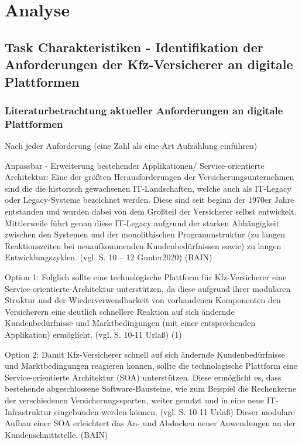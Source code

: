 \chapter{Analyse}
\section{Task Charakteristiken - Identifikation der Anforderungen der Kfz-Versicherer an digitale Plattformen}

\subsection{Literaturbetrachtung aktueller Anforderungen an digitale Plattformen}

Nach jeder Anforderung (eine Zahl als eine Art Aufzählung einführen)

Anpassbar - Erweiterung bestehender Applikationen/ Service-orientierte Architektur: Eine der größten Herausforderungen der Versicherungsunternehmen sind die die historisch gewachsenen IT-Landschaften, welche auch als IT-Legacy oder Legacy-Systeme bezeichnet werden. Diese sind seit beginn der 1970er Jahre entstanden und wurden dabei von dem Großteil der Versicherer selbst entwickelt. Mittlerweile führt genau diese IT-Legacy aufgrund der starken Abhängigkeit zwischen den Systemen und der monolithischen Programmstruktur (zu langen Reaktionszeiten bei neuaufkommenden Kundenbedürfnissen sowie) zu langen Entwicklungszyklen. (vgl. S. 10 – 12 Gunter2020) (BAIN)

Option 1:
Folglich sollte eine technologische Plattform für Kfz-Versicherer eine Service-orientierte-Architektur unterstützen, da diese aufgrund ihrer modularen Struktur und der Wiederverwendbarkeit von vorhandenen Komponenten den Versicherern eine deutlich schnellere Reaktion auf sich ändernde Kundenbedürfnisse und Marktbedingungen (mit einer entsprechenden Applikation) ermöglicht. (vgl. S. 10-11 Urlaß) (1) 

Option 2:
Damit Kfz-Versicherer schnell auf sich ändernde Kundenbedürfnisse und Marktbedingungen reagieren können, sollte die technologische Plattform eine Service-orientierte Architektur (SOA) unterstützen. Diese ermöglicht es, dass bestehende abgeschlossene Software-Bausteine, wie zum Beispiel die Rechenkerne der verschiedenen Versicherungssparten, weiter genutzt und in eine neue IT-Infrastruktur eingebunden werden können. (vgl. S. 10-11 Urlaß) Dieser modulare Aufbau einer SOA erleichtert das An- und Abdocken neuer Anwendungen an der Kundenschnittstelle. (BAIN)

